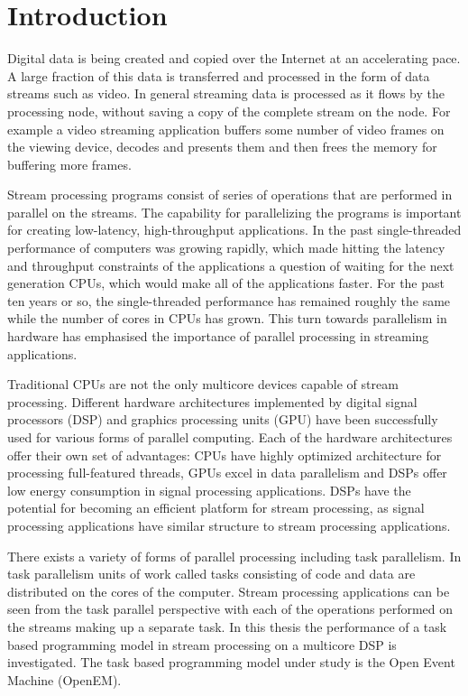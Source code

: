 \chapter{Introduction}
\label{chapter:introduction}
Digital data is being created and copied over the Internet at an accelerating pace. A large fraction of this data is transferred and processed in the form of data streams such as video. In general streaming data is processed as it flows by the processing node, without saving a copy of the complete stream on the node. For example a video streaming application buffers some number of video frames on the viewing device, decodes and presents them and then frees the memory for buffering more frames.

Stream processing programs consist of series of operations that are performed in parallel on the streams. The capability for parallelizing the programs is important for creating low-latency, high-throughput applications. In the past single-threaded performance of computers was growing rapidly, which made hitting the latency and throughput constraints of the applications a question of waiting for the next generation CPUs, which would make all of the applications faster. For the past ten years or so, the single-threaded performance has remained roughly the same while the number of cores in CPUs has grown. This turn towards parallelism in hardware has emphasised the importance of parallel processing in streaming applications.

Traditional CPUs are not the only multicore devices capable of stream processing. Different hardware architectures implemented by digital signal processors (DSP) and graphics processing units (GPU) have been successfully used for various forms of parallel computing. Each of the hardware architectures offer their own set of advantages: CPUs have highly optimized architecture for processing full-featured threads, GPUs excel in data parallelism and DSPs offer low energy consumption in signal processing applications. DSPs have the potential for becoming an efficient platform for stream processing, as signal processing applications have similar structure to stream processing applications.

There exists a variety of forms of parallel processing including task parallelism. In task parallelism units of work called tasks consisting of code and data are distributed on the cores of the computer. Stream processing applications can be seen from the task parallel perspective with each of the operations performed on the streams making up a separate task. In this thesis the performance of a task based programming model in stream processing on a multicore DSP is investigated. The task based programming model under study is the Open Event Machine (OpenEM).

